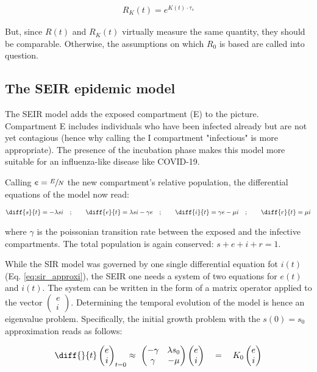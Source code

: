\documentclass[DIV=12, BCOR=0pt]{scrartcl}  %
\begin{document}
  \begin{align}
  	R_K(t) = e^{K(t) \cdot \tau_s}
  	\label{eq:RKt}
  \end{align}

	But, since $R(t)$ and $R_K(t)$ virtually measure the same quantity, they should be comparable. Otherwise, the assumptions on which $R_0$ is based are called into question.
  
  \subsection{The SEIR epidemic model}
  The SEIR model adds the exposed compartment (E) to the picture. Compartment E includes individuals who have been infected already but are not yet contagious (hence why calling the I compartment "infectious" is more appropriate). The presence of the incubation phase makes this model more suitable for an influenza-like disease like COVID-19. 
  
  Calling $e = \sfrac{E}{N}$ the new compartment's relative population, the differential equations of the model now read:
  
  \begin{align}
  	\diff{s}{t} = - \lambda s i \quad;  \qquad 	\diff{e}{t} = \lambda s i - \gamma e \quad; \qquad \diff{i}{t} = \gamma e - \mu i \quad; \qquad \diff{r}{t} = \mu i
  	\label{eq:seir}
  \end{align}

  where $\gamma$ is the poissonian transition rate between the exposed and the infective compartments. The total population is again conserved: $ s + e + i + r = 1$.
  
  While the SIR model was governed by one single differential equation fot $i(t)$ (Eq. \ref{eq:sir_approxi}), the SEIR one needs a system of two equations for $e(t)$ and $i(t)$.
  The system can be written in the form of a matrix operator applied to the vector $ \left( \begin{smallmatrix} e \\	i \end{smallmatrix} \right)$. Determining the temporal evolution of the model is hence an eigenvalue problem. Specifically, the initial growth problem with the $s(0) = s_0$ approximation reads as follows: 
  
  \begin{align}
  	\diff{}{t}
  	\begin{pmatrix}
  			e \\
  			i
  	\end{pmatrix}_{t=0}
  	\approx \
  	\begin{pmatrix}
  		 - \gamma & \lambda s_0\\
  		 \gamma & - \mu
  	\end{pmatrix}
  	\begin{pmatrix}
  		e \\
  		i
  	\end{pmatrix}
	  \quad = \quad K_0 %
	  \begin{pmatrix}
	  	e \\
	  	i
	  \end{pmatrix} %
		\label{eq:seir_approxi}
	\end{align}
\end{document}
